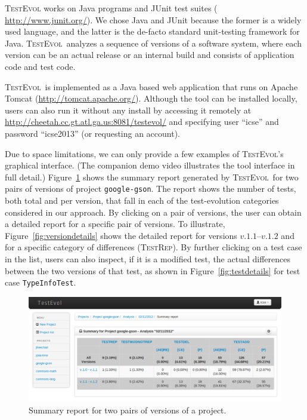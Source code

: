 \documentclass[conference]{IEEEtran}
\newcommand{\subject}[1]{\texttt{\small #1}}
\newcommand{\catrep}{\textsc{TestRep}}
\newcommand{\tool}{\textsc{TestEvol}\xspace}
\begin{document}

\tool works on Java programs and JUnit test suites ({\small
  \url{http://www.junit.org/}}). We chose Java and JUnit because the
former is a widely used language, and the latter is the de-facto
standard unit-testing framework for Java.  \tool\ analyzes a sequence
of versions of a software system, where each version can be an actual
release or an internal build and consists of application code and test
code.

\tool\ is implemented as a Java based web application that runs on
Apache Tomcat ({\small \url{http://tomcat.apache.org/}}). Although the
tool can be installed locally, users can also run it without any
install by accessing it remotely at {\small
  \url{http://cheetah.cc.gt.atl.ga.us:8081/testevol/}} and specifying
user ``icse'' and password ``icse2013'' (or requesting an account).

Due to space limitations, we can only provide a few examples of
\tool's graphical interface. (The companion demo video illustrates the
tool interface in full detail.) Figure~\ref{fig:summary} shows the
summary report generated by \tool\ for two pairs of versions of
project \subject{google-gson}. The report shows the number of tests,
both total and per version, that fall in each of the test-evolution
categories considered in our approach.  By clicking on a pair of
versions, the user can obtain a detailed report for a specific pair of
versions.  To illustrate, Figure~\ref{fig:versiondetails} shows the
detailed report for versions $v.1.1$--$v.1.2$ and for a specific
category of differences (\catrep). By further clicking on a test case
in the list, users can also inspect, if it is a modified test, the
actual differences between the two versions of that test, as shown in
Figure~\ref{fig:testdetails} for test case \subject{TypeInfoTest}.

\begin{figure}[t]
	\centering
	\includegraphics[width=\columnwidth]{1-summary}
        \vspace*{-20pt}
	\caption{Summary report for two pairs of versions of a
          project.}
        \vspace*{-8pt}
	\label{fig:summary}
\end{figure}
\end{document}
